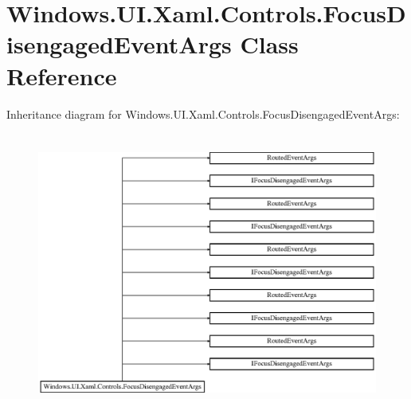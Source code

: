 \hypertarget{class_windows_1_1_u_i_1_1_xaml_1_1_controls_1_1_focus_disengaged_event_args}{}\section{Windows.\+U\+I.\+Xaml.\+Controls.\+Focus\+Disengaged\+Event\+Args Class Reference}
\label{class_windows_1_1_u_i_1_1_xaml_1_1_controls_1_1_focus_disengaged_event_args}
Inheritance diagram for Windows.\+U\+I.\+Xaml.\+Controls.\+Focus\+Disengaged\+Event\+Args\+:\begin{figure}[H]
\begin{center}
\leavevmode
\includegraphics[height=9.249249cm]{class_windows_1_1_u_i_1_1_xaml_1_1_controls_1_1_focus_disengaged_event_args}
\end{center}
\end{figure}
